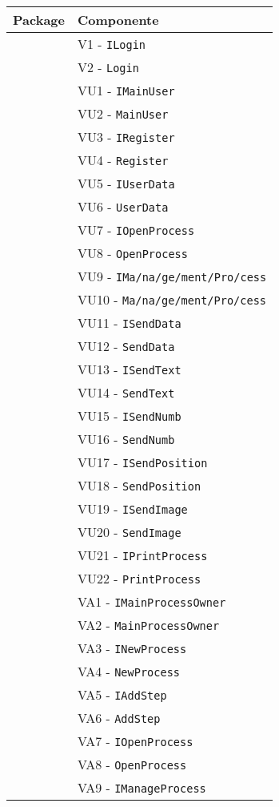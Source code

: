 \begin{longtable}{XX}
\toprule
\textbf{Package} & \textbf{Componente}\\
\midrule
\view{}&V1 - \texttt{ILogin}\\ 
&V2 - \texttt{Login}\\ 
\midrule
\viewUser{}&VU1 - \texttt{IMainUser}\\
&VU2 - \texttt{MainUser}\\
&VU3 - \texttt{IRegister}\\
&VU4 - \texttt{Register}\\
&VU5 - \texttt{IUserData}\\
&VU6 - \texttt{UserData}\\
&VU7 - \texttt{IOpenProcess}\\ 
&VU8 - \texttt{OpenProcess}\\ 
&VU9 - \texttt{IMa\fshyp{}na\fshyp{}ge\fshyp{}ment\fshyp{}Pro\fshyp{}cess}\\ 
&VU10 - \texttt{Ma\fshyp{}na\fshyp{}ge\fshyp{}ment\fshyp{}Pro\fshyp{}cess}\\ 
&VU11 - \texttt{ISendData}\\ 
&VU12 - \texttt{SendData}\\ 
&VU13 - \texttt{ISendText}\\ 
&VU14 - \texttt{SendText}\\ 
&VU15 - \texttt{ISendNumb}\\ 
&VU16 - \texttt{SendNumb}\\ 
&VU17 - \texttt{ISendPosition}\\ 
&VU18 - \texttt{SendPosition}\\ 
&VU19 - \texttt{ISendImage}\\ 
&VU20 - \texttt{SendImage}\\ 
&VU21 - \texttt{IPrintProcess}\\ 
&VU22 - \texttt{PrintProcess}\\ 
\midrule
\viewAdmin{}&VA1 - \texttt{IMainProcessOwner}\\
&VA2 - \texttt{MainProcessOwner}\\
&VA3 - \texttt{INewProcess}\\ 
&VA4 - \texttt{NewProcess}\\ 
&VA5 - \texttt{IAddStep}\\ 
&VA6 - \texttt{AddStep}\\ 
&VA7 - \texttt{IOpenProcess}\\ 
&VA8 - \texttt{OpenProcess}\\ 
&VA9 - \texttt{IManageProcess}\\ 

\end{longtable}
